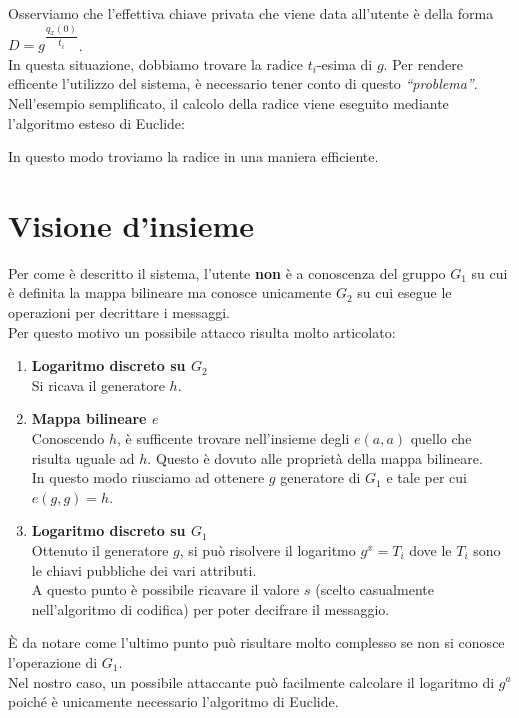 Osserviamo che l'effettiva chiave privata che viene data all'utente è della forma $D = g^{\dfrac{q_x(0)}{t_i}}$.\\
In questa situazione, dobbiamo trovare la radice $t_i$-esima di $g$. Per rendere efficente l'utilizzo del sistema, è necessario tener conto di questo \emph{``problema''}.\\
Nell'esempio semplificato, il calcolo della radice viene eseguito mediante l'algoritmo esteso di Euclide:

\begin{center}
\end{center}

In questo modo troviamo la radice in una maniera efficiente.



\section{Visione d'insieme}


Per come è descritto il sistema, l'utente \textbf{non} è a conoscenza del gruppo $G_1$ su cui è definita la mappa bilineare ma conosce unicamente $G_2$ su cui esegue le operazioni per decrittare i messaggi.\\
Per questo motivo un possibile attacco risulta molto articolato:
\begin{enumerate}
   \item\textbf{ Logaritmo discreto su $G_2$}\\
   Si ricava il generatore $h$.
   \item \textbf{Mappa bilineare $e$}\\
   Conoscendo $h$, è sufficente trovare nell'insieme degli $e(a,a)$ quello che risulta uguale ad $h$. Questo è dovuto alle proprietà della mappa bilineare.\\
   In questo modo riusciamo ad ottenere $g$ generatore di $G_1$ e tale per cui $e(g,g) = h$.
   \item\textbf{ Logaritmo discreto su $G_1$}\\
   Ottenuto il generatore $g$, si può risolvere il logaritmo $g^x = T_i$ dove le $T_i$ sono le chiavi pubbliche dei vari attributi.\\
   A questo punto è possibile ricavare il valore $s$ (scelto casualmente nell'algoritmo di codifica) per poter decifrare il messaggio.
\end{enumerate}

È da notare come l'ultimo punto può risultare molto complesso se non si conosce l'operazione di $G_1$.\\
Nel nostro caso, un possibile attaccante può facilmente calcolare il logaritmo di $g^a$ poiché è unicamente necessario l'algoritmo di Euclide.\\[0.5cm]
